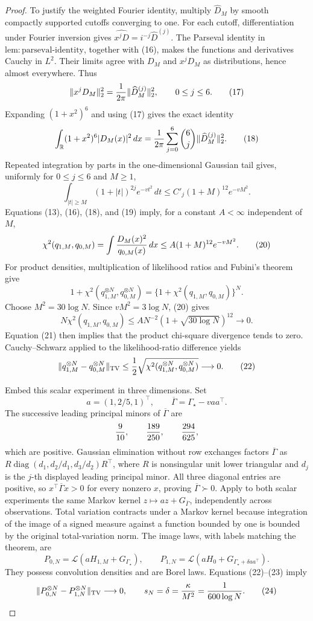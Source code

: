 \documentclass{article}
\begin{document}
\begin{proof}
To justify the weighted Fourier identity, multiply \(\widehat D_M\) by smooth compactly supported cutoffs converging to one.  For each cutoff, differentiation under Fourier inversion gives \(\widehat{x^jD}=i^{-j}\widehat D^{(j)}\).  The Parseval identity in \(\mathrm{lem:parseval\text{-}identity}\), together with (16), makes the functions and derivatives Cauchy in \(L^2\).  Their limits agree with \(D_M\) and \(x^jD_M\) as distributions, hence almost everywhere.  Thus
\[
 \|x^jD_M\|_2^2={1\over2\pi}\|\widehat D_M^{(j)}\|_2^2,
 \qquad0\le j\le6. \tag{17}
\]
Expanding \((1+x^2)^6\) and using (17) gives the exact identity
\[
 \int_{\mathbb R}(1+x^2)^6|D_M(x)|^2\,dx
 ={1\over2\pi}\sum_{j=0}^6{6\choose j}
 \|\widehat D_M^{(j)}\|_2^2. \tag{18}
\]
Repeated integration by parts in the one-dimensional Gaussian tail gives, uniformly for \(0\le j\le6\) and \(M\ge1\),
\[
 \int_{|t|\ge M}(1+|t|)^{2j}e^{-vt^2}\,dt
 \le C'_j(1+M)^{12}e^{-vM^2}. \tag{19}
\]
Equations (13), (16), (18), and (19) imply, for a constant \(A<\infty\) independent of \(M\),
\[
 \chi^2(q_{1,M},q_{0,M})
 =\int {D_M(x)^2\over q_{0,M}(x)}\,dx
 \le A(1+M)^{12}e^{-vM^2}. \tag{20}
\]
For product densities, multiplication of likelihood ratios and Fubini's theorem give
\[
 1+\chi^2(q_{1,M}^{\otimes N},q_{0,M}^{\otimes N})
 =\{1+\chi^2(q_{1,M},q_{0,M})\}^{N}. \tag{21}
\]
Choose \(M^2=30\log N\).  Since \(vM^2=3\log N\), (20) gives
\[
 N\chi^2(q_{1,M},q_{0,M})
 \le A N^{-2}(1+\sqrt{30\log N})^{12}\longrightarrow0.
\]
Equation (21) then implies that the product chi-square divergence tends to zero.  Cauchy--Schwarz applied to the likelihood-ratio difference yields
\[
 \|q_{1,M}^{\otimes N}-q_{0,M}^{\otimes N}\|_{\mathrm{TV}}
 \le{1\over2}\sqrt{\chi^2(q_{1,M}^{\otimes N},q_{0,M}^{\otimes N})}
 \longrightarrow0. \tag{22}
\]

Embed this scalar experiment in three dimensions.  Set
\[
 a=(1,2/5,1)^\top,\qquad
 \overline\Gamma=\Gamma_\star-vaa^\top.
\]
The successive leading principal minors of \(\overline\Gamma\) are
\[
 {9\over10},\qquad {189\over250},\qquad {294\over625},
\]
which are positive.  Gaussian elimination without row exchanges factors \(\overline\Gamma\) as \(R\operatorname{diag}(d_1,d_2/d_1,d_3/d_2)R^\top\), where \(R\) is nonsingular unit lower triangular and \(d_j\) is the \(j\)-th displayed leading principal minor.  All three diagonal entries are positive, so \(x^\top\overline\Gamma x>0\) for every nonzero \(x\), proving \(\overline\Gamma\succ0\).  Apply to both scalar experiments the same Markov kernel \(z\mapsto az+G_{\overline\Gamma}\), independently across observations.  Total variation contracts under a Markov kernel because integration of the image of a signed measure against a function bounded by one is bounded by the original total-variation norm.  The image laws, with labels matching the theorem, are
\[
 P_{0,N}=\mathcal L(aH_{1,M}+G_{\Gamma_\star}),
 \qquad
 P_{1,N}=\mathcal L(aH_0+G_{\Gamma_\star+\delta aa^\top}). \tag{23}
\]
They possess convolution densities and are Borel laws.  Equations (22)--(23) imply
\[
 \|P_{0,N}^{\otimes N}-P_{1,N}^{\otimes N}\|_{\mathrm{TV}}
 \longrightarrow0,
 \qquad
 s_N=\delta={\kappa\over M^2}={1\over600\log N}. \tag{24}
\]


\end{proof}
\end{document}
